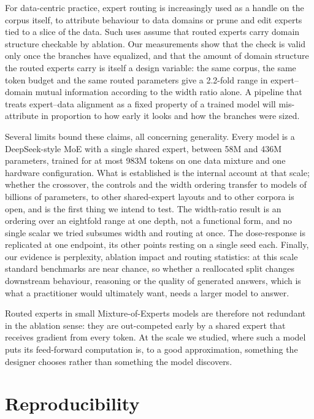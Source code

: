 \documentclass[conference,11pt]{IEEEtran}
\begin{document}
For data-centric practice, expert routing is increasingly used as a handle on the corpus itself,
to attribute behaviour to data domains or prune and edit experts tied to a slice of the data. Such
uses assume that routed experts carry domain structure checkable by ablation. Our measurements show that the check is valid only once the branches
have equalized, and that the amount of domain structure the routed experts carry is itself a
design variable: the same corpus, the same token budget and the same routed parameters give a
2.2-fold range in expert--domain mutual information according to the width ratio alone. A pipeline
that treats expert--data alignment as a fixed property of a trained model will mis-attribute in
proportion to how early it looks and how the branches were sized.

Several limits bound these claims, all concerning generality. Every
model is a DeepSeek-style MoE with a single shared expert, between 58M and 436M parameters, trained
for at most 983M tokens on one data mixture and one hardware configuration. What is established is
the internal account at that scale; whether the crossover, the controls and the width ordering
transfer to models of billions of parameters, to other shared-expert layouts and to other corpora
is open, and is the first thing we intend to test. The width-ratio result is an ordering over an
eightfold range at one depth, not a functional form, and no single scalar we tried subsumes width
and routing at once. The dose-response is replicated at one endpoint, its other points resting on
a single seed each. Finally, our evidence is perplexity, ablation impact and routing statistics:
at this scale standard benchmarks are near chance, so whether a reallocated split changes
downstream behaviour, reasoning or the quality of generated answers, which is what a practitioner
would ultimately want, needs a larger model to answer.

Routed experts in small Mixture-of-Experts models are therefore not redundant in the ablation
sense: they are out-competed early by a shared expert that receives gradient from every token.
At the scale we studied, where such a model puts its feed-forward computation is, to a good
approximation, something the designer chooses rather than something the model discovers.

\section*{Reproducibility}
\end{document}
